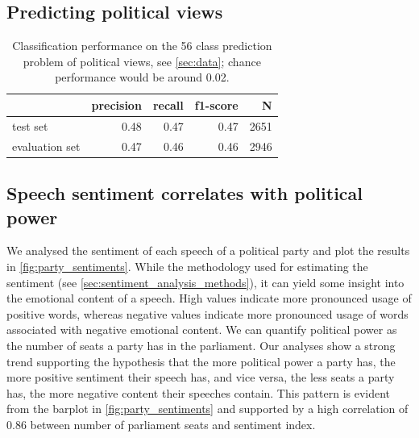 \documentclass[runningheads,a4paper]{llncs}
\begin{document}
\subsection{Predicting political views}

\begin{table}[t]
\begin{center}
\begin{tabular}{lrrrr}
    &         precision    &recall &  f1-score  & N\\
\hline\hline
test set    &  0.48   &   0.47  &    0.47  &    2651\\
evaluation set    &  0.47    &  0.46 &     0.46 &     2946\\
%
\end{tabular}
\end{center}
\caption{
\label{tab:results_avg_political_view}
Classification performance on the 56 class prediction problem of political views, see \autoref{sec:data}; chance performance would be around 0.02.
}
\end{table}

\subsection{Speech sentiment correlates with political power}\label{sec:sentiment_result}
We analysed the sentiment of each speech of a political party and plot the results in \autoref{fig:party_sentiments}. While the methodology used for estimating the sentiment (see \autoref{sec:sentiment_analysis_methods}), it can yield some insight into the emotional content of a speech. High values indicate more pronounced usage of positive words, whereas negative values indicate more pronounced usage of words associated with negative emotional content. We can quantify political power as the number of seats a party has in the parliament. Our analyses show a strong trend supporting the hypothesis that the more political power a party has, the more positive sentiment their speech has, and vice versa, the less seats a party has, the more negative content their speeches contain. This pattern is evident from the barplot in \autoref{fig:party_sentiments} and supported by a high correlation of 0.86 between number of parliament seats and sentiment index.
\end{document}
